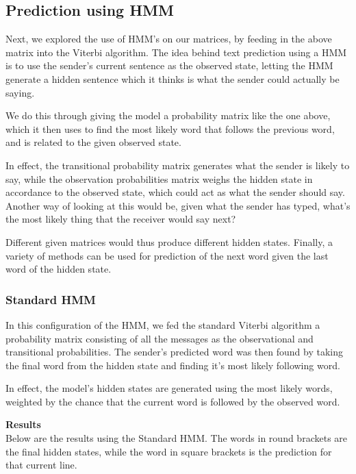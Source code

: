 \documentclass{article}
\begin{document}
\subsection{Prediction using HMM}
Next, we explored the use of HMM's on our matrices, by feeding in the above
matrix into the Viterbi algorithm.
The idea behind text prediction using a HMM is to use the sender's current
sentence as the observed state, letting the HMM generate a hidden sentence
which it thinks is what the sender could actually be saying.

We do this through giving the model a probability matrix like the one above,
which it then uses to find the most likely word that follows the previous word,
and is related to the given observed state.

In effect, the transitional probability matrix generates what the sender is
likely to say, while the observation probabilities matrix weighs the hidden
state in accordance to the observed state, which could act as what the sender
should say. Another way of looking at this would be, given what the sender has
typed, what's the most likely thing that the receiver would say next?

Different given matrices would thus produce different hidden states. Finally, a
variety of methods can be used for prediction of the next word given the last
word of the hidden state.

\subsubsection{Standard HMM}
In this configuration of the HMM, we fed the standard Viterbi algorithm a
probability matrix consisting of all the messages as the observational and
transitional probabilities. The sender's predicted word was then found by
taking the final word from the hidden state and finding it's most likely
following word.

In effect, the model's hidden states are generated using the most likely words,
weighted by the chance that the current word is followed by the observed word.

\textbf{Results}\\
Below are the results using the Standard HMM. The words in round brackets are
the final hidden states, while the word in square brackets is the prediction
for that current line.
\end{document}
